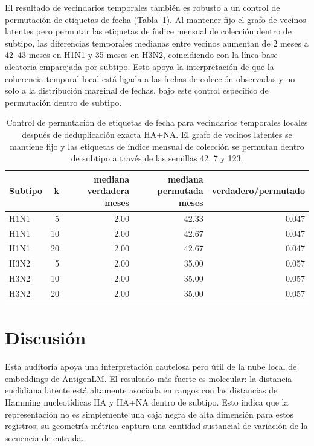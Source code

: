 \documentclass[11pt]{article}
\begin{document}
El resultado de vecindarios temporales también es robusto a un control de permutación de etiquetas de fecha (Tabla~\ref{tab:temporal-permutation}). Al mantener fijo el grafo de vecinos latentes pero permutar las etiquetas de índice mensual de colección dentro de subtipo, las diferencias temporales medianas entre vecinos aumentan de 2 meses a 42--43 meses en H1N1 y 35 meses en H3N2, coincidiendo con la línea base aleatoria emparejada por subtipo. Esto apoya la interpretación de que la coherencia temporal local está ligada a las fechas de colección observadas y no solo a la distribución marginal de fechas, bajo este control específico de permutación dentro de subtipo.

\begin{table}[H]
\centering
\caption{Control de permutación de etiquetas de fecha para vecindarios temporales locales después de deduplicación exacta HA+NA. El grafo de vecinos latentes se mantiene fijo y las etiquetas de índice mensual de colección se permutan dentro de subtipo a través de las semillas 42, 7 y 123.}
\label{tab:temporal-permutation}
\begin{tabular}{lrrrr}
\toprule
Subtipo & k & mediana verdadera meses & mediana permutada meses & verdadero/permutado \\
\midrule
H1N1 & 5 & 2.00 & 42.33 & 0.047 \\
H1N1 & 10 & 2.00 & 42.67 & 0.047 \\
H1N1 & 20 & 2.00 & 42.67 & 0.047 \\
H3N2 & 5 & 2.00 & 35.00 & 0.057 \\
H3N2 & 10 & 2.00 & 35.00 & 0.057 \\
H3N2 & 20 & 2.00 & 35.00 & 0.057 \\
\bottomrule
\end{tabular}
\end{table}

\section{Discusión}

Esta auditoría apoya una interpretación cautelosa pero útil de la nube local de embeddings de AntigenLM. El resultado más fuerte es molecular: la distancia euclidiana latente está altamente asociada en rangos con las distancias de Hamming nucleotídicas HA y HA+NA dentro de subtipo. Esto indica que la representación no es simplemente una caja negra de alta dimensión para estos registros; su geometría métrica captura una cantidad sustancial de variación de la secuencia de entrada.
\end{document}
